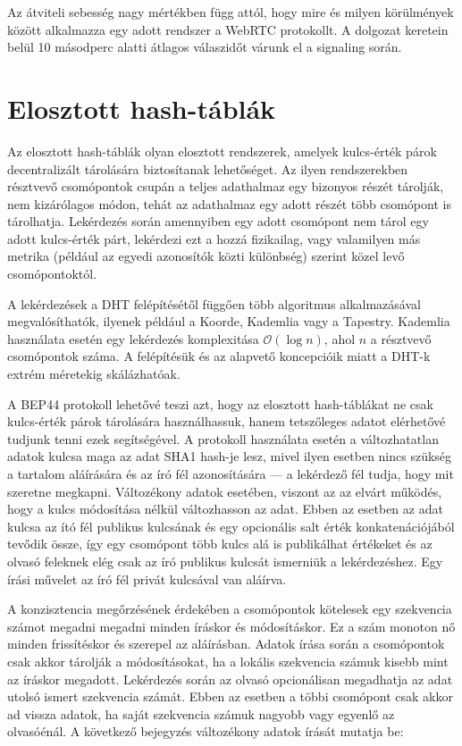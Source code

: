 Az átviteli sebesség nagy mértékben függ attól, hogy mire és milyen körülmények között alkalmazza egy adott rendszer
a WebRTC protokollt.
A dolgozat keretein belül 10 másodperc alatti átlagos válaszidőt várunk el a signaling során.


\section{Elosztott hash-táblák}\label{sec:elosztott-hash-táblák}

Az elosztott hash-táblák olyan elosztott rendszerek, amelyek kulcs-érték párok decentralizált tárolására biztosítanak
lehetőséget.
Az ilyen rendszerekben résztvevő csomópontok csupán a teljes adathalmaz egy bizonyos részét tárolják, nem kizárólagos
módon, tehát az adathalmaz egy adott részét több csomópont is tárolhatja.
Lekérdezés során amennyiben egy adott csomópont nem tárol egy adott kulcs-érték párt, lekérdezi ezt a hozzá fizikailag, vagy
valamilyen más metrika (például az egyedi azonosítók közti különbség) szerint közel levő csomópontoktól.

A lekérdezések a DHT felépítésétől függően több algoritmus alkalmazásával megvalósíthatók, ilyenek például a Koorde,
Kademlia vagy a Tapestry.
Kademlia használata esetén egy lekérdezés komplexitása $\mathcal{O}(\log{}n)$, ahol $n$ a résztvevő csomópontok száma.
A felépítésük és az alapvető koncepcióik miatt a DHT-k extrém méretekig skálázhatóak.

A BEP44\cite{BEP} protokoll lehetővé teszi azt, hogy az elosztott hash-táblákat ne csak kulcs-érték párok tárolására használhassuk,
hanem tetszőleges adatot elérhetővé tudjunk tenni ezek segítségével.
A protokoll használata esetén a változhatatlan adatok kulcsa maga az adat SHA1 hash-je lesz, mivel ilyen esetben nincs
szükség a tartalom aláírására és az író fél azonosítására — a lekérdező fél tudja, hogy mit szeretne megkapni.
Változékony adatok esetében, viszont az az elvárt működés, hogy a kulcs módosítása nélkül változhasson az adat.
Ebben az esetben az adat kulcsa az ító fél publikus kulcsának és egy opcionális salt érték konkatenációjából tevődik
össze, így egy csomópont több kulcs alá is publikálhat értékeket és az olvasó feleknek elég csak az író publikus kulcsát
ismerniük a lekérdezéshez.
Egy írási művelet az író fél privát kulcsával van aláírva.

A konzisztencia megőrzésének érdekében a csomópontok kötelesek egy szekvencia számot megadni megadni minden íráskor és
módosításkor.
Ez a szám monoton nő minden frissítéskor és szerepel az aláírásban.
Adatok írása során a csomópontok csak akkor tárolják a módosításokat, ha a lokális szekvencia számuk kisebb mint az íráskor
megadott.
Lekérdezés során az olvasó opcionálisan megadhatja az adat utolsó ismert szekvencia számát.
Ebben az esetben a többi csomópont csak akkor ad vissza adatok, ha saját szekvencia számuk nagyobb vagy egyenlő az olvasóénál.
A következő bejegyzés változékony adatok írását mutatja be:

